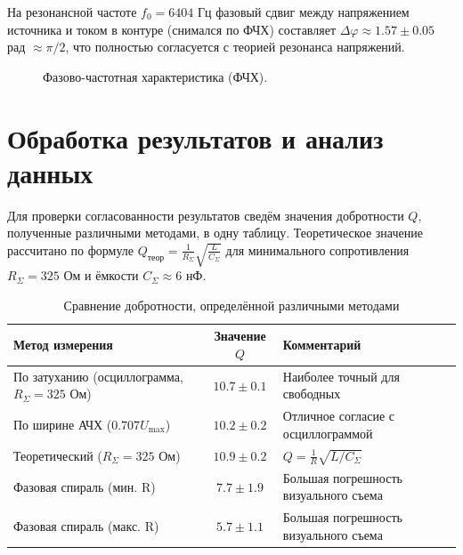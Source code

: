 \documentclass[a4paper,12pt]{extarticle}
\begin{document}
На резонансной частоте $f_0 = 6404$ Гц фазовый сдвиг между напряжением источника и током в контуре (снимался по ФЧХ) составляет $\Delta\varphi \approx 1.57 \pm 0.05$ рад $\approx \pi/2$, что полностью согласуется с теорией резонанса напряжений.

\begin{figure}[H]
    \centering
    \caption{Фазово-частотная характеристика (ФЧХ).}
    \label{fig:fchx}
\end{figure}

\newpage
\section*{Обработка результатов и анализ данных}

Для проверки согласованности результатов сведём значения добротности $Q$, полученные различными методами, в одну таблицу. Теоретическое значение рассчитано по формуле $Q_{\text{теор}} = \frac{1}{R_\Sigma}\sqrt{\frac{L}{C_\Sigma}}$ для минимального сопротивления $R_\Sigma = 325$ Ом и ёмкости $C_\Sigma \approx 6$ нФ.

\begin{table}[H]
    \centering
    \caption{Сравнение добротности, определённой различными методами}
    \begin{tabular}{|l|c|l|}
        \hline
        \textbf{Метод измерения} & \textbf{Значение $Q$} & \textbf{Комментарий} \\ \hline
        По затуханию (осциллограмма, $R_\Sigma=325$ Ом) & $10.7 \pm 0.1$ & Наиболее точный для свободных \\ \hline
        По ширине АЧХ ($0.707 U_{\max}$) & $10.2 \pm 0.2$ & Отличное согласие с осциллограммой \\ \hline
        Теоретический ($R_\Sigma=325$ Ом) & $10.9 \pm 0.2$ & $Q = \frac{1}{R}\sqrt{L/C_\Sigma}$ \\ \hline
        Фазовая спираль (мин. R) & $7.7 \pm 1.9$ & Большая погрешность визуального съема \\ \hline
        Фазовая спираль (макс. R) & $5.7 \pm 1.1$ & Большая погрешность визуального съема \\ \hline
    \end{tabular}
\end{table}
\end{document}
